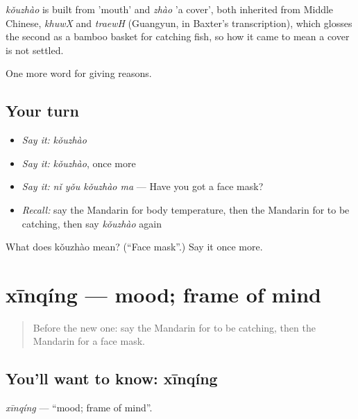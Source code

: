 \begin{cousinweb}
\emph{kǒuzhào} is built from  'mouth' and \emph{zhào} 'a cover', both inherited from Middle Chinese, \emph{khuwX} and \emph{traewH} (Guangyun, in Baxter's transcription), which glosses the second as a bamboo basket for catching fish, so how it came to mean a cover is not settled.
\end{cousinweb}

\begin{grammarlens}[title={What you've built}]
One more word for giving reasons.
\end{grammarlens}

\subsection*{Your turn}
\begin{itemize}
\raggedright
  \item \emph{Say it:} \emph{kǒuzhào}
  \item \emph{Say it:} \emph{kǒuzhào}, once more
  \item \emph{Say it:} \emph{nǐ yǒu kǒuzhào ma} — Have you got a face mask?
  \item \emph{Recall:} say the Mandarin for body temperature, then the Mandarin for to be catching, then say \emph{kǒuzhào} again
\end{itemize}

\begin{tcolorbox}[breakable,colback=teal!4,colframe=teal!35!black,title={Before you move on}]
What does kǒuzhào mean? (\textquotedblleft{}Face mask\textquotedblright{}.) Say it once more.
\end{tcolorbox}
\section[xīnqíng]{xīnqíng — mood; frame of mind}

\label{lesson:ZH-C245-xinqing}



\begin{quote}
Before the new one: say the Mandarin for to be catching, then the Mandarin for a face mask.
\end{quote}

\subsection*{You'll want to know: xīnqíng}
\emph{xīnqíng} — \textquotedblleft{}mood; frame of mind\textquotedblright{}.

